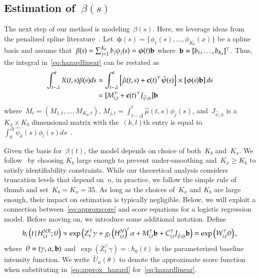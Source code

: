\documentclass[12pt]{amsart}
\def\given{\, | \,}
\begin{document}
\subsection{Estimation of~$\beta(s)$}
\label{section:beta}

The next step of our method is modeling~$\beta(s)$. Here, we leverage ideas from the penalized spline literature~\citep{Ruppert2003, Wood2006book}. Let~$\mathbold{\phi} (s) = \{ \phi_1 (s), \ldots, \phi_{K_b} (x) \}$ be a spline basis and assume that~$\beta(s) = \sum_{j=1}^{K_b} b_j \phi_{j} (s) = \mathbold{\phi} (t) {\bf b}$ where~${\bf b} = [b_1, \ldots, b_{K_b}]^{\top}$. Thus, the integral in~\eqref{eq:hazardlinear} can be restated as
\begin{align*}
\int_{t-\Delta}^t X(t,s) \beta(s) ds
  &\approx \int_{t-\Delta}^t \left[ \hat \mu(t,s) + {\bf c} (t)^\top
    \mathbold{\hat \psi} (s) \right] \times \left[
    \mathbold{\phi} (s) {\bf b} \right] ds \\
  &= [ M_{i,t}^\top + {\bf c} (t)^\top J_{\hat \psi, \phi} ] {\bf b}
\end{align*}
where~$M_{t} = (M_{1,t}, \ldots, M_{K_b,t})$, $M_{j,t} = \int_{t-\Delta}^t \hat \mu (t,s) \phi_j (s)$, and~$J_{\hat \psi, \phi}$ is a $K_x \times K_b$ dimensional matrix with the~$(k,l)$th entry is equal to~$\int_{0}^\Delta \hat \psi_k (s) \phi_l (s) ds$~\citep{RamsaySilverman2005}.

Given the basis for~$\beta(t)$, the model depends on choice of both~$K_b$ and~$K_x$.  We follow~\cite{Ruppert2002} by choosing $K_b$ large enough to prevent under-smoothing and~$K_x \geq K_b$ to satisfy identifiability constraints. While our theoretical analysis considers truncation levels that depend on~$n$, in practice, we follow the simple rule of thumb and set~$K_b = K_x = 35$. As long as the choices of~$K_x$ and $K_b$ are large enough, their impact on estimation is typically negligible. Below, we will exploit a connection between~\eqref{eq:approxscore} and score equations for a logistic regression model.  Before moving on, we introduce some additional notation. Define
\begin{equation}
\label{eq:approx_hazard}
h_i \left( t \given  H_{i,t}^{NX} ; \theta \right) \approx
\exp \left( Z_{t}^\top \gamma + g_t \left( H_{i,t}^{N} \right)^{\prime} \alpha
  + M_{i,t}^\top {\bf b} + C_{i,t}^\top J_{\hat \psi, \phi} {\bf b} \right)
= \exp \left( W_{i,t}^\top \theta \right),
\end{equation}
where~$\theta = (\gamma, \alpha, {\bf b})$ and~$\exp ( Z_{t}^\top \gamma) =: h_0 (t)$ is the parameterized baseline intensity function. We write~$\tilde U_n (\theta)$ to denote the approximate score function when substituting in~\eqref{eq:approx_hazard} for~\eqref{eq:hazardlinear}.
\end{document}
